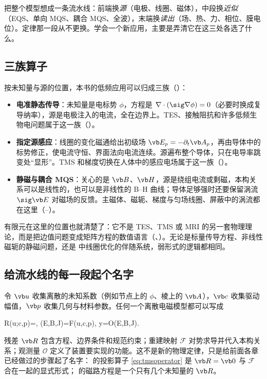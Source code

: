 \begin{intuition}
把整个模型想成一条流水线：前端换\emph{源}（电极、线圈、磁体），中段换\emph{近似}（EQS、单向 MQS、耦合 MQS、全波），末端换\emph{读出}（场、热、力、相位、膜电位）。定律那一段从不更换。学会一个新应用，主要是弄清它在这三处各选了什么。
\end{intuition}

\subsection{三族算子}
按未知量与源的位置，本书的低频应用可以归成三族（）：
\begin{itemize}
\item \textbf{电准静态传导}：未知量是电标势 $\phi$，方程是 $\nabla\cdot(\sig\nabla\phi)=0$（必要时换成复导纳率），源是电极注入的电流，全在边界上。TES、接触阻抗和许多低频生物电问题属于这一族（）。
\item \textbf{指定源感应}：线圈的变化磁通给出初级场 $\vb E_p=-\partial_t\vb A_p$，再由导体中的标势修正，使电流守恒、界面法向电流连续。源遍布整个导体，只在电导率跳变处“显形”。TMS 和梯度切换在人体中的感应电场属于这一族（）。
\item \textbf{静磁与耦合 MQS}：关心的是 $\vb B$、$\vb H$，源是绕组电流或剩磁，本构关系可以是线性的，也可以是非线性的 B--H 曲线；导体足够强时还要保留涡流 $\sig\vb E$ 对磁场的反馈。主磁体、磁轭、梯度与匀场线圈、屏蔽中的涡流都在这里（--）。
\end{itemize}


有限元在这里的位置也就清楚了：它不是 TES、TMS 或 MRI 的另一套物理理论，而是把边值问题变成矩阵方程的数值语言（、）。无论是标量传导方程、非线性磁轭的静磁问题，还是 中线圈优化的伴随系统，弱形式的逻辑都相同。

\subsection{给流水线的每一段起个名字}
令 $\vb u$ 收集离散的未知系数（例如节点上的 $\phi$、棱上的 $\vb A$），$\vb c$ 收集驱动幅值，$\vb p$ 收集几何与材料参数。任何一个离散电磁模型都可以写成
\begin{keyeq}
\vb R(\vb u;\vb c,\vb p)=,\qquad
(\vb E,\vb B,\vb J)=\mathcal F(\vb u,\vb c,\vb p),\qquad
y=\mathcal O(\vb E,\vb B,\vb J).
\label{eq:wholeoperator}
\end{keyeq}
残差 $\vb R$ 包含方程、边界条件和规范约束；重建映射 $\mathcal F$ 对势求导并代入本构关系；观测量 $\mathcal O$ 定义了装置要实现的功能。这不是新的物理定律，只是给前面各章已经做过的步骤起了名字： 的投影算子 \eqref{eq:tmsoperator} 是 $\vb R=\vb 0$ 与 $\mathcal F$ 合在一起的显式形式； 的磁路方程是一个只有几个未知量的 $\vb R$。

